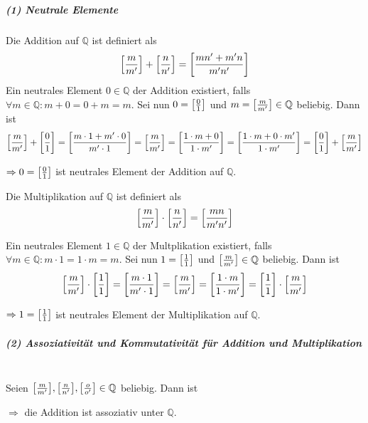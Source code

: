 \documentclass{scrreprt}
\begin{document}
\newpage
\subparagraph{(1) Neutrale Elemente}
Die Addition auf $\mathbb{Q}$ ist definiert als
\[
  \qty[\frac{m}{m'}] + \qty[\frac{n}{n'}] = \qty[\frac{mn' + m'n}{m'n'}]
\]
Ein neutrales Element $0 \in \mathbb{Q}$ der Addition existiert, falls
$\forall m \in \mathbb{Q} \colon m + 0 = 0 + m = m$.
Sei nun $0 = \qty[\frac{0}{1}]$ und $m = \qty[\frac{m}{m'}] \in \mathbb{Q}$
beliebig.
Dann ist
\[
  \qty[\frac{m}{m'}] + \qty[\frac{0}{1}] =
  \qty[\frac{m \cdot 1 + m' \cdot 0}{m' \cdot 1}]
  = \qty[\frac{m}{m'}]
  = \qty[\frac{1 \cdot m + 0}{1 \cdot m'}]
  = \qty[\frac{1 \cdot m + 0 \cdot m'}{1 \cdot m'}]
  = \qty[\frac{0}{1}] + \qty[\frac{m}{m'}]
\]

$\Rightarrow 0 = \qty[\frac{0}{1}]$ ist neutrales Element der Addition auf
$\mathbb{Q}$.

Die Multiplikation auf $\mathbb{Q}$ ist definiert als
\[
  \qty[\frac{m}{m'}] \cdot \qty[\frac{n}{n'}] = \qty[\frac{mn}{m'n'}]
\]

Ein neutrales Element $1 \in \mathbb{Q}$ der Multplikation existiert, falls
$\forall m \in \mathbb{Q} \colon m \cdot 1 = 1 \cdot m = m$.
Sei nun $1 = \qty[\frac{1}{1}]$ und $\qty[\frac{m}{m'}] \in \mathbb{Q}$
beliebig.
Dann ist
\[
  \qty[\frac{m}{m'}] \cdot \qty[\frac{1}{1}] =
  \qty[\frac{m \cdot 1}{m' \cdot 1}]
  = \qty[\frac{m}{m'}]
  = \qty[\frac{1 \cdot m}{1 \cdot m'}]
  = \qty[\frac{1}{1}] \cdot \qty[\frac{m}{m'}]
\]

$\Rightarrow 1 = \qty[\frac{1}{1}]$ ist neutrales Element der Multiplikation auf
$\mathbb{Q}$.

\subparagraph{(2) Assoziativität und Kommutativität für Addition und
  Multiplikation}

\:\\
Seien $\qty[\frac{m}{m'}], \qty[\frac{n}{n'}], \qty[\frac{o}{o'}] \in \mathbb{Q}$ beliebig.
Dann ist
$\Rightarrow$ die Addition ist assoziativ unter $\mathbb{Q}$.
\end{document}
